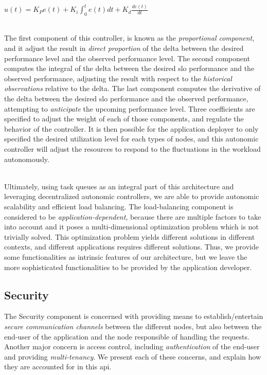 \documentclass[12pt, titlepage]{uo_temp}
\begin{document}
     \\ \begin{center}
       $u(t)= K_P e(t) + K_i \int_0^t e(t) dt + K_d \frac{de(t)}{dt}$
       \end{center}\\

     The first component of this controller, is known as the \emph{proportional component}, and
     it adjust the result in \emph{direct proportion} of the delta between the desired
     performance level and the observed performance level.  The second component computes
     the integral of the delta between the desired \gls{slo} performance and the observed
     performance, adjusting the result with respect to the \emph{historical observations}
     relative to the delta. The last component computes the derivative of the delta
     between the desired \gls{slo} performance and the observed performance, attempting to
     \emph{anticipate} the upcoming performance level. Three coefficients are specified to adjust
     the weight of each of those components, and regulate the behavior of the
     controller. It is then possible for the application deployer to only specified the
     desired utilization level for each types of nodes, and this autonomic controller will
     adjust the resources to respond to the fluctuations in the workload autonomously.

     \\ Ultimately, using task queues as an integral part of this architecture and
     leveraging decentralized autonomic controllers, we are able to provide autonomic
     scalability and efficient load balancing. The load-balancing component is considered
     to be \emph{application-dependent}, because there are multiple factors to take into
     account and it poses a multi-dimensional optimization problem which is not trivially
     solved. This optimization problem yields different solutions in different contexts,
     and different applications requires different solutions. Thus, we provide some
     functionalities as intrinsic features of our architecture, but we leave the more
     sophisticated functionalities to be provided by the application developer.

     \subsection{Security}
     The Security component is concerned with providing means to establish/entertain
     \emph{secure communication channels} between the different nodes, but also between
     the end-user of the application and the node responsible of handling the
     requests. Another major concern is access control, including \emph{authentication} of
     the end-user and providing \emph{multi-tenancy}. We present each of these concerns,
     and explain how they are accounted for in this \gls{api}.
\end{document}
